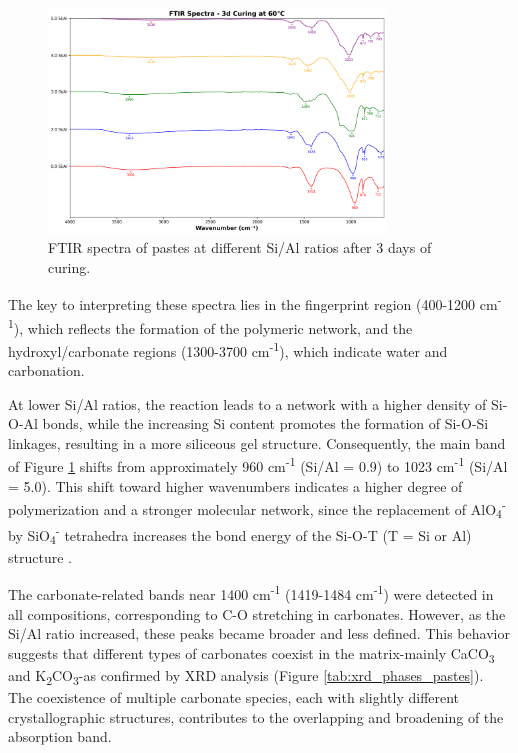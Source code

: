 \begin{figure}[H]
    \centering
    \includegraphics[width=0.8\textwidth]{Cap4/images/ftir_comparison_3d_curing.png}
    \caption{FTIR spectra of pastes at different Si/Al ratios after 3 days of curing.}
    \label{fig:ftir_pastes}
\end{figure}

The key to interpreting these spectra lies in the fingerprint region (400-1200 cm\textsuperscript{-1}), which reflects the formation of the polymeric network, and the hydroxyl/carbonate regions (1300-3700 cm\textsuperscript{-1}), which indicate water and carbonation.

At lower Si/Al ratios, the reaction leads to a network with a higher density of Si-O-Al bonds, while the increasing Si content promotes the formation of Si-O-Si linkages, resulting in a more siliceous gel structure.
Consequently, the main band of Figure \ref{fig:ftir_pastes} shifts from approximately 960 cm\textsuperscript{-1} (Si/Al = 0.9) to 1023 cm\textsuperscript{-1} (Si/Al = 5.0).
This shift toward higher wavenumbers indicates a higher degree of polymerization and a stronger molecular network, since the replacement of AlO\textsubscript{4}\textsuperscript{-} by SiO\textsubscript{4}\textsuperscript{-} tetrahedra increases the bond energy of the Si-O-T (T = Si or Al) structure \cite{pachecotorgal2014handbook, ma2022calcium, provis2009geopolymers}.

The carbonate-related bands near 1400 cm\textsuperscript{-1} (1419-1484 cm\textsuperscript{-1}) were detected in all compositions, corresponding to C-O stretching in carbonates. However, as the Si/Al ratio increased, these peaks became broader and less defined. This behavior suggests that different types of carbonates coexist in the matrix-mainly CaCO\textsubscript{3} and K\textsubscript{2}CO\textsubscript{3}-as confirmed by XRD analysis (Figure \ref{tab:xrd_phases_pastes}). The coexistence of multiple carbonate species, each with slightly different crystallographic structures, contributes to the overlapping and broadening of the absorption band.

